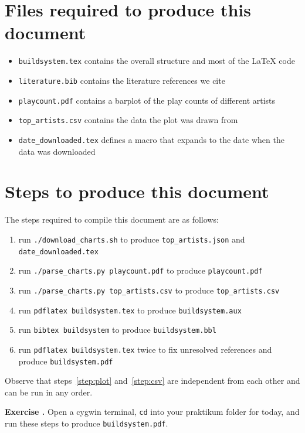 \documentclass[a4paper,11pt]{article}
\newcounter{exercisectr}
\newcommand{\exercise}[1]{%
\par%
\stepcounter{exercisectr}%
\vspace{\baselineskip}%
\noindent\textbf{Exercise \arabic{exercisectr}\ifthenelse{\equal{#1}{}}{}{ : #1}%
.}\quad%
}
\begin{document}
\tableofcontents{}

\section{Files required to produce this document}

\begin{itemize}
\item \texttt{buildsystem.tex} contains the overall structure and most of the \LaTeX{} code
\item \texttt{literature.bib} contains the literature references we cite
\item \texttt{playcount.pdf} contains a barplot of the play counts of different artists
\item \texttt{top\_artists.csv} contains the data the plot was drawn from
\item \texttt{date\_downloaded.tex} defines a macro that expands to the date when the data was downloaded
\end{itemize}

\section{Steps to produce this document}
\label{sec:steps}

The steps required to compile this document are as follows:
\begin{enumerate}
\item run \texttt{./download\_charts.sh} to produce \texttt{top\_artists.json} and \texttt{date\_downloaded.tex}
\item \label{step:plot} run \texttt{./parse\_charts.py playcount.pdf} to produce \texttt{playcount.pdf}
\item \label{step:csv} run \texttt{./parse\_charts.py top\_artists.csv} to produce \texttt{top\_artists.csv}
\item run \texttt{pdflatex buildsystem.tex} to produce \texttt{buildsystem.aux}
\item run \texttt{bibtex buildsystem} to produce \texttt{buildsystem.bbl}
\item run \texttt{pdflatex buildsystem.tex} twice to fix unresolved references and produce \texttt{buildsystem.pdf}
\end{enumerate}

Observe that steps~\ref{step:plot} and~\ref{step:csv} are independent from each other and can be run in any order.

\exercise{} Open a cygwin terminal, \verb|cd| into your praktikum folder for today, and run these steps to produce \verb|buildsystem.pdf|.
\end{document}
